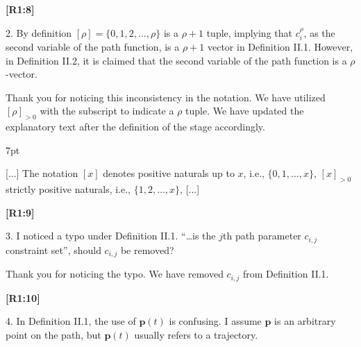 \documentclass[10pt]{letter}
\newenvironment{formal}{%
  \def\FrameCommand{%
    \hspace{1pt}%
    {\color{red}\vrule width 2pt}%
    {\color{formalshade}\vrule width 4pt}%
    \colorbox{formalshade}%
  }%
  \MakeFramed{\advance\hsize-\width\FrameRestore}%
  \noindent\hspace{-4.55pt}%
  \begin{adjustwidth}{}{7pt}%
  \vspace{2pt}\vspace{2pt}%
}
{%
  \vspace{2pt}\end{adjustwidth}\endMakeFramed%
}
\begin{document}
{\hspace*{-4.5em}\textbf{[R1:8]}\vspace*{-1.9em}}

2. By definition $[\rho]=\{0,1,2,...,\rho\}$ is a $\rho+1$ tuple, implying that $c^\rho_i$, as the second variable of the path function, is a $\rho+1$ vector in Definition II.1. However, in Definition II.2, it is claimed that the second variable of the path function is a $\rho$-vector.

{\color{blue} 

{\hspace*{-4.5em}{[R1:8]}\vspace*{-1.9em}}

Thank you for noticing this inconsistency in the notation. We have utilized $[\rho]_{>0}$ with the subscript to indicate a $\rho$ tuple. We have updated the explanatory text after the definition of the stage accordingly.

\begin{formal}
  \color{black}
  [...] The notation $[x]$ denotes positive naturals up to $x$, i.e., $\{0,1,\dots,x\}$, {\color{blue}$[x]_{>0}$ strictly positive naturals, i.e., $\{1,2,\dots,x\}$,} [...]
  \vspace*{1ex}
\end{formal}
}

{\hspace*{-4.5em}\textbf{[R1:9]}\vspace*{-1.9em}}

3. I noticed a typo under Definition II.1. ``\dots is the $j$th path parameter $c_{i,j}$ constraint set'', should $c_{i,j}$ be removed?

{\color{blue} 

{\hspace*{-4.5em}{[R1:9]}\vspace*{-1.9em}}

Thank you for noticing the typo. We have removed $c_{i,j}$ from Definition II.1.}

{\hspace*{-4.5em}\textbf{[R1:10]}\vspace*{-1.9em}}

4. In Definition II.1, the use of $\mathbf{p}(t)$ is confusing. I assume $\mathbf{p}$ is an arbitrary point on the path, but $\mathbf{p}(t)$ usually refers to a trajectory.
\end{document}
